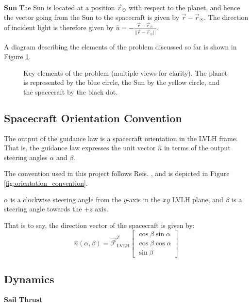 \textbf{Sun}
The Sun is located at a position \(\vec{r}_{\astrosun}\) with respect to the planet, and hence the vector going from the Sun to the spacecraft is given by \(\vec{r} - \vec{r}_{\astrosun}\). The direction of incident light is therefore given by \(\hat{u} = -\frac{\vec{r} - \vec{r}_{\astrosun}}{||\vec{r} - \vec{r}_{\astrosun}||}\).

A diagram describing the elements of the problem discussed so far is shown in Figure \ref{fig:problem_setup}.
\begin{figure}[H]
    \centering
    
    
    \caption{Key elements of the problem (multiple views for clarity). The planet is represented by the blue circle, the Sun by the yellow circle, and the spacecraft by the black dot.}
    \label{fig:problem_setup}
\end{figure}


\subsection{Spacecraft Orientation Convention}
The output of the guidance law is a spacecraft orientation in the LVLH frame. That is, the guidance law expresses the unit vector \(\hat{n}\) in terms of the output steering angles \(\alpha\) and \(\beta\).

The convention used in this project follows Refs. \cite{petropoulos2004low, vargaperez2016, sanjeev2023}, and is depicted in Figure \ref{fig:orientation_convention}.


\(\alpha\) is a clockwise steering angle from the \(y\)-axis in the \(xy\) LVLH plane, and \(\beta\) is a steering angle towards the \(+z\) axis.

That is to say, the direction vector of the spacecraft is given by:
\begin{equation}
    \hat{n}(\alpha, \beta) = \mathcal{\vec{F}}_{\text{LVLH}}^T
    \begin{bmatrix}
        \cos \beta \sin \alpha \\
        \cos \beta \cos \alpha \\
        \sin \beta
    \end{bmatrix}
    \label{eq:alpha_beta_n}
\end{equation}


\subsection{Dynamics}
\textbf{Sail Thrust}

